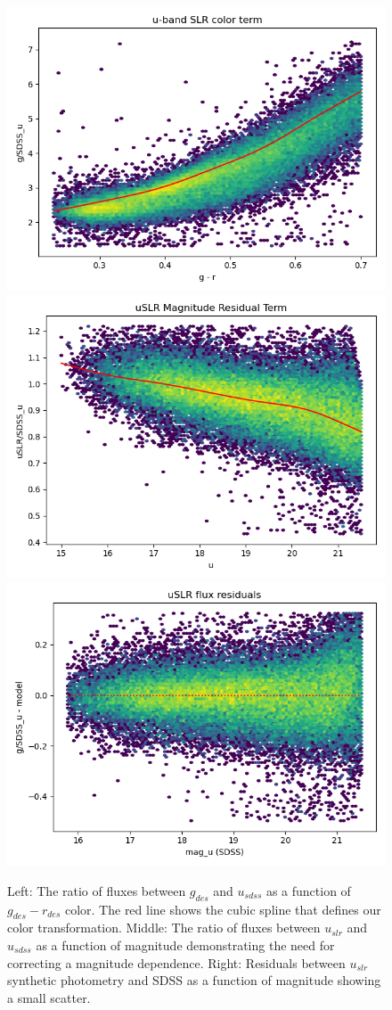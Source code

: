 \begin{figure}
    \includegraphics[width=0.32\linewidth]{./figures/u-band/uslr/transformed_to_SDSS_band_g_slr.png}
    \includegraphics[width=0.32\linewidth]{./figures/u-band/uslr/transformed_to_SDSS_band_g_slr_mag_offset.png}
    \includegraphics[width=0.32\linewidth]{./figures/u-band/uslr/transformed_to_SDSS_band_g_slr_flux_residuals.png}
    \label{fig:slr_spline}
    \caption{
    Left: The ratio of fluxes between $g_{des}$ and $u_{sdss}$ as a function of $g_{des}-r_{des}$ color. The red line shows the cubic spline that defines our color transformation.
    Middle: The ratio of fluxes between $u_{slr}$ and $u_{sdss}$ as a function of magnitude demonstrating the need for correcting a magnitude dependence. 
    Right: Residuals between $u_{slr}$ synthetic photometry and SDSS as a function of magnitude showing a small scatter.}
\end{figure}

